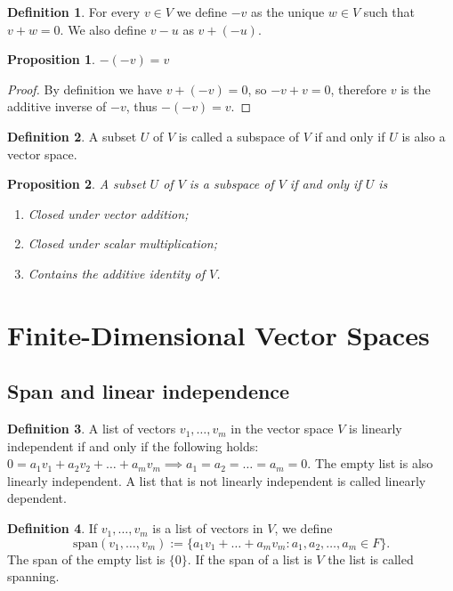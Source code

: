 \documentclass{article}
\newtheorem{proposition}{Proposition}[subsection]
\theoremstyle{definition}
\newtheorem{definition}{Definition}[subsection]
\theoremstyle{remark}
\newcommand{\set}[1]{\{#1\}}
\begin{document}
\begin{definition}
    For every $v \in V$ we define $-v$ as the unique $w \in V$ such that $v + w = 0$. We also define $v - u$ as $v + (-u)$.
\end{definition}

\begin{proposition}
    $-(-v) = v$
\end{proposition}

\begin{proof}
    By definition we have $v + (-v) = 0$, so $-v + v = 0$, therefore $v$ is the additive inverse of $-v$, thus $-(-v) = v$.
\end{proof}

\begin{definition}
    A subset $U$ of $V$ is called a subspace of $V$ if and only if $U$ is also a vector space.
\end{definition}

\begin{proposition}
    A subset $U$ of $V$ is a subspace of $V$ if and only if $U$ is
    \begin{enumerate}
        \item Closed under vector addition;
        \item Closed under scalar multiplication;
        \item Contains the additive identity of $V$.
    \end{enumerate}
\end{proposition}

\section{Finite-Dimensional Vector Spaces}

\subsection{Span and linear independence}

\begin{definition}
    A list of vectors $v_1, \dots, v_m$ in the vector space $V$ is linearly independent if and only if the following holds: $0 = a_1 v_1 + a_2 v_2 + \dots + a_m v_m \implies a_1 = a_2 = \dots = a_m = 0$. The empty list is also linearly independent. A list that is not linearly independent is called linearly dependent.
\end{definition}


\begin{definition}
    If $v_1, \dots, v_m$ is a list of vectors in $V$, we define $$\text{span}(v_1, \dots, v_m) := \set{a_1 v_1 + \dots + a_m v_m : a_1, a_2, \dots, a_m \in F}.$$ The span of the empty list is $\set{0}$. If the span of a list is $V$ the list is called spanning.
\end{definition}
\end{document}
